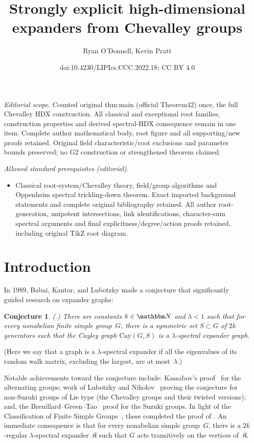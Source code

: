 \documentclass[10pt,a4paper]{article}
\title{Strongly explicit high-dimensional expanders from Chevalley groups}
\author{Ryan O'Donnell, Kevin Pratt}
\date{doi:10.4230/LIPIcs.CCC.2022.18; CC BY 4.0}
\newtheorem{conjecture}[theorem]{Conjecture}
\theoremstyle{definition}
\newcommand{\N}{\mathbbm N}
\newcommand{\Cay}{\mathrm{Cay}}
\newcommand{\complex}{\mathfrak{K}}
\begin{document}
\maketitle
\noindent\textit{Editorial scope.} Counted original thm:main (official Theorem42) once, the full Chevalley HDX construction. All classical and exceptional root families, construction properties and derived spectral-HDX consequence remain in one item. Complete author mathematical body, root figure and all supporting/new proofs retained. Original field characteristic/root exclusions and parameter bounds preserved; no G2 construction or strengthened theorem claimed.\par\medskip
\noindent\textit{Allowed standard prerequisites (editorial).}\begin{itemize}
\item Classical root-system/Chevalley theory, field/group algorithms and Oppenheim spectral trickling-down theorem. Exact imported background statements and complete original bibliography retained. All author root-generation, unipotent intersections, link identifications, character-sum spectral arguments and final explicitness/degree/action proofs retained, including original TikZ root diagram.
\end{itemize}\medskip
\section{Introduction}
In 1989, Babai, Kantor, and Lubotzky made a conjecture that significantly guided research on expander graphs:
\begin{conjecture}      \label{conj:1}
    (\cite{BKL89}.) There are constants $k \in \N$ and $\lambda < 1$ such that for every nonabelian finite simple group~$G$, there is a symmetric set $S \subset G$ of $2k$ generators such that the Cayley graph $\Cay(G,S)$ is a $\lambda$-spectral expander graph.
\end{conjecture}
\noindent (Here we say that a graph is a $\lambda$-spectral expander if all the eigenvalues of its random walk matrix, excluding the largest, are at most~$\lambda$.)

Notable achievements toward the conjecture include: Kassabov's proof~\cite{Kas07} for the alternating groups; work of Lubotzky and Nikolov~\cite{KLN06} proving the conjecture for non-Suzuki groups of Lie type (the Chevalley groups and their twisted versions); and, the Breuillard--Green--Tao~\cite{BGT11} proof for the Suzuki groups.
In light of the Classification of Finite Simple Groups~\cite{Asc04}, these completed the proof of .
An immediate consequence is that for every nonabelian simple group~$G$, there is a $2k$-regular $\lambda$-spectral expander~$\complex$ such that $G$ acts transitively on the vertices of~$\complex$.
\end{document}
